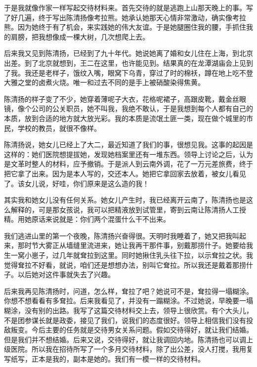  于是我就像作家一样写起交待材料来。首先交待的就是逃跑上山那天晚上的事。写了好几遍，终于写出陈清扬像考拉熊。她承认她那天心情非常激动，确实像考拉熊。因为她终于有了机会，来实践她的伟大友谊。于是她腿圈住我的腰，手抓住我的肩膀，把我想像成一棵大树，几次想爬上去。 
 
 后来我又见到陈清扬，已经到了九十年代。她说她离了婚和女儿住在上海，到北京出差。到了北京就想到，王二在这里，也许能见到。结果真的在龙潭湖庙会上见到了我。我还是老样子，饿纹入嘴，眼窝下乌青，穿过了时的棉袄，蹲在地上吃不登大雅之堂的卤煮火烧。唯一和过去不同的是手上被硝酸染得焦黄。 
 
 陈清扬的样子变了不少，她穿着薄呢子大衣，花格呢裙子，高跟皮靴，戴金丝眼镜，像个公司的公关职员，她不叫我，我绝不敢认，于是我想到每个人都有自己的本质，放到合适的地方就大放光彩。我的本质是流氓土匪一类，现在做个城里的市民，学校的教员，就很不像样。 
 
 陈清扬说，她女儿已经上了大二，最近知道了我们的事，很想见我。这事的起因是这样的：她们医院想提拔她，发现她档案里还有一堆东西。领导上讨论之后，认为是文革时整人的材料，应予撤销。于是派人到云南外调，花了一万元差旅费，终于把它拿了出来。因为是本人写的，交还本人。她把它拿回家去放着，被女儿看见了。该女儿说，好哇，你们原来是这么造的我！ 
 
 其实我和她女儿没有任何关系。她女儿产生时，我已经离开云南了，陈清扬也是这么解释的，可是那女孩说，我可以把精液放到试管里，寄到云南让陈清扬人工授精。用她原话来说就是：你们两个混蛋什么干不出来。 
 
 我们逃进山里的第一个夜晚，陈清扬兴奋得很。天明时我睡着了，她又把我叫起来，那时节大雾正从墙缝里流进来，她让我再干那件事，别戴那捞什子。她要给我生一窝小崽子，过几年就耷拉到这里。同时她揪住乳头往下拉，以示耷拉之状。我觉得耷拉不好看，就说，咱们还是想想办法，别叫它耷拉。所以我还是戴着那捞什子。以后她对这件事就失去了兴趣。 
 
 后来我再见陈清扬时，问道，怎么样，耷拉了吧？她说可不是，耷拉得一塌糊涂。你想不想看看有多耷拉。后来我看见了，并没有一蹋糊涂。不过她说，早晚要一塌糊涂，没有别的出路。我写了这篇交待材料交上去，领导上很欣赏。有个大头儿，不是团参谋长就是政委，接见了我们，说我们的态度很好。领导上相信我们没有投敌叛变。今后主要的任务就是交待男女关系问题。假如交待得好，就让我们结婚。但是我们并不想结婚。后来又说，交待得好，就让我调回内地。陈清扬也可以调上级医院。所以我在招待所写了一个多月交待材料，除了出公差，没人打搅，我用复写纸写，正本是我的，副本是她的。我们有一模一样的交待材料。 
 
